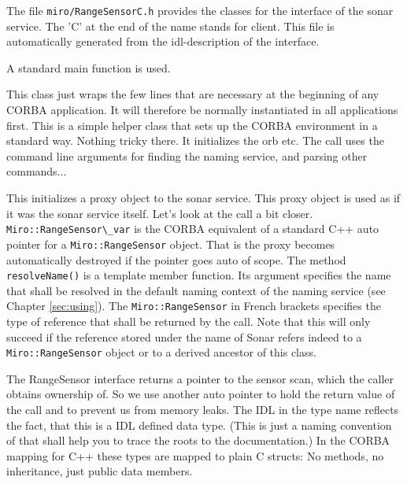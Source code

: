 The file \lstinline!miro/RangeSensorC.h! provides the classes for the interface of the
sonar service. The 'C' at the end of the name stands for client. This
file is automatically generated from the idl-description of the interface.



A standard main function is used.



This class just wraps the few lines that are necessary at the beginning of any CORBA
application. It will therefore be normally instantiated in all \miro
applications first. This is a simple helper class that sets up the
CORBA environment in a standard way. Nothing tricky there.  It
initializes the orb etc. The call uses the command line arguments for
finding the naming service, and parsing other commands...



This initializes a proxy object to the
sonar service. This proxy object is used as if it was the sonar service
itself. Let's look at the call a bit closer. \lstinline!Miro::RangeSensor\_var!
is the CORBA equivalent of a standard C++ auto pointer for a
\lstinline!Miro::RangeSensor! object. That is the proxy becomes automatically
destroyed if the pointer goes auto of scope. The method
{\tt resolveName()} is a template member function. Its argument
specifies the name that shall be resolved in the default naming
context of the naming service (see Chapter \ref{sec:using}). The
\lstinline!Miro::RangeSensor! in French brackets specifies the type of
reference that shall be returned by the call. Note that this will only
succeed if the reference stored under the name of Sonar refers indeed
to a {\tt Miro::RangeSensor} object or to a derived ancestor of this
class.



The RangeSensor interface returns a pointer to the sensor scan, which
the caller obtains ownership of. So we use another auto pointer to
hold the return value of the call and to prevent us from memory leaks.
The IDL in the type name reflects the fact, that this is a IDL defined
data type. (This is just a naming convention of \miro that shall help
you to trace the roots to the documentation.) In the CORBA mapping for
C++ these types are mapped to plain C structs: No methods, no
inheritance, just public data members.

